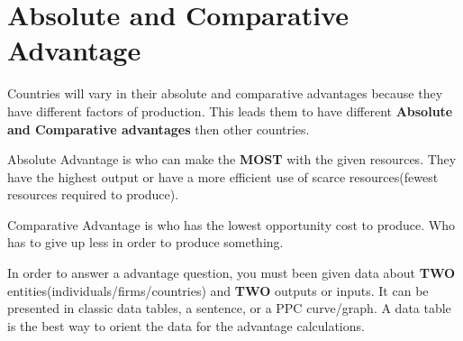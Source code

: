 \section{Absolute and Comparative Advantage}

Countries will vary in their absolute and comparative advantages because they have different factors of production. This leads them to have different \textbf{Absolute and Comparative advantages} then other countries. 
\begin{definition}
    Absolute Advantage is who can make the \textbf{MOST} with the given resources. They have the highest output or have a more efficient use of scarce resources(fewest resources required to produce).
\end{definition}
\begin{definition}
    Comparative Advantage is who has the lowest opportunity cost to produce. Who has to give up less in order to produce something. 
\end{definition}

In order to answer a advantage question, you must been given data about \textbf{TWO} entities(individuals/firms/countries) and \textbf{TWO} outputs or inputs. It can be presented in classic data tables, a sentence, or a PPC curve/graph. A data table is the best way to orient the data for the advantage calculations. 

